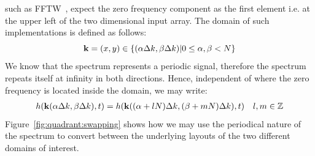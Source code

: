 such as FFTW~\citep{FFTW05}, expect the zero frequency component as the first element
i.e. at the upper left of the two dimensional input array.
The \wavevector domain of such implementations is defined as follows:
\begin{equation*}
\mathbf{k} = (x,y)\in\{(\alpha\Delta k,\beta\Delta k)|
0\leq\alpha,\beta<N\}
\end{equation*}
%
We know that the spectrum represents a periodic signal, therefore the spectrum
repeats itself at infinity in both directions. Hence, independent of where the
zero frequency is located inside the \wavevector domain, we may write:
%
\begin{align*}
 h(\mathbf{k}(\alpha\Delta k,\beta\Delta k),t) = h(\mathbf{k}((\alpha + lN)\Delta k, (\beta +mN)\Delta k),t) && l,m \in \mathbb{Z}
\end{align*}
%
Figure~\ref{fig:quadrant:swapping} shows how we may use the periodical nature
of the spectrum to convert between the underlying layouts of the two different
\wavevector domains of interest.
%
%
